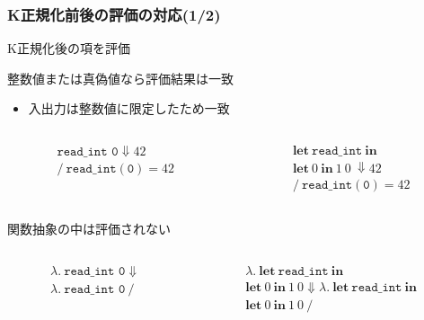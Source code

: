 \documentclass[dvipdfmx,cjk,xcolor=dvipsnames,envcountsect,notheorems,12pt]{beamer}
\theoremstyle{definition}
\newcommand{\keyword}[1]{\mathbf{#1}}
\newcommand{\LET}{\keyword{let}}
\newcommand{\IN}{\keyword{in}}
\begin{document}
\begin{frame}
	\frametitle{K正規化前後の評価の対応(1/2)}
	{\LARGE K正規化後の項を評価}

	\vfill

	\Large 整数値または真偽値なら評価結果は一致
	\begin{itemize}
		\item 入出力は整数値に限定したため一致
	\end{itemize}
	{\normalsize \begin{columns}
		\begin{column}{0.4\textwidth}
			\[\begin{array}{l}
				\texttt{read\_int 0}\Downarrow 42 \\
				/~\texttt{read\_int}(\texttt{0})=42
			\end{array}\]
		\end{column}
		\begin{column}{0.4\textwidth}
			\[ 
				\begin{array}{l}
					\LET~\texttt{read\_int}~\IN \\
					\LET~0~\IN~1~0~\Downarrow 42 \\
					/~\texttt{read\_int}(\texttt{0})=42
				\end{array}
			\]
		\end{column}
	\end{columns}}

	\vfill

	関数抽象の中は評価されない
	{\normalsize \begin{columns}
		\begin{column}{0.4\textwidth}
			\[\begin{array}{l}
				\lambda.~\texttt{read\_int 0} \Downarrow \\
				\lambda.~\texttt{read\_int 0}~/
			\end{array} \]
		\end{column}
		\begin{column}{0.6\textwidth}
			\[ \begin{array}{l}
				\lambda.~\LET~\texttt{read\_int}~\IN \\
				\LET~0~\IN~1~0\Downarrow
				\lambda.~\LET~\texttt{read\_int}~\IN \\
				\LET~0~\IN~1~0~/ \\
			\end{array} \]
		\end{column}
	\end{columns}}
\end{frame}
\end{document}
